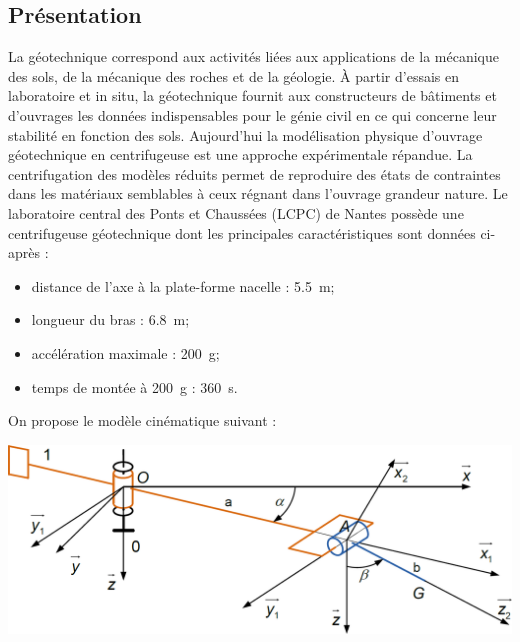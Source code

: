 \documentclass[10pt,fleqn]{article} %
\begin{document}
\def\pathfig{images}

\vspace{5cm}
\pagestyle{fancy}
\thispagestyle{plain}

\def\columnseprulecolor{\color{ocre}}
\setlength{\columnseprule}{0.4pt} 

\def\pathfig{images}

\ifprof
\else
\begin{multicols}{2}
\fi

\subsection*{Présentation}
La géotechnique correspond aux activités liées aux applications de la mécanique des sols, de la mécanique des roches et de la
géologie. À partir d'essais en laboratoire et in situ, la géotechnique fournit aux constructeurs de bâtiments et d'ouvrages les
données indispensables pour le génie civil en ce qui concerne leur stabilité en fonction des sols. Aujourd'hui la modélisation
physique d'ouvrage géotechnique en centrifugeuse est une approche expérimentale répandue. La centrifugation des modèles
réduits permet de reproduire des états de contraintes dans les matériaux semblables à ceux régnant dans l'ouvrage grandeur
nature. Le laboratoire central des Ponts et Chaussées (LCPC) de Nantes possède une centrifugeuse géotechnique dont les
principales caractéristiques sont données ci-après :
\begin{itemize}
\item distance de l'axe à la plate-forme nacelle : \SI{5,5}{m};
\item longueur du bras : \SI{6,8}{m};
\item accélération maximale : \SI{200}{g};
\item temps de montée à \SI{200}{g} : \SI{360}{s}.
\end{itemize}

On propose le modèle cinématique suivant :
\begin{center}
\includegraphics[width=\linewidth]{images/fig_01}
\end{center}


\end{multicols}
\end{document}
